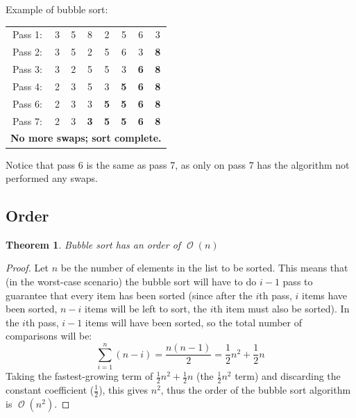 \documentclass{book}
\DeclareMathOperator{\bigO}{\mathcal{O}}
\newtheorem{theorem}{Theorem}[section]
\begin{document}
                Example of bubble sort: \\
                \begin{center}
                \begin{tabular}{c c c c c c c c}
                    Pass 1: &3 &5 &8 &2 &5 &6 &3 \\
                    Pass 2: &3 &5 &2 &5 &6 &3 &\textbf{8} \\
                    Pass 3: &3 &2 &5 &5 &3 &\textbf{6} &\textbf{8} \\
                    Pass 4: &2 &3 &5 &3 &\textbf{5} &\textbf{6} &\textbf{8} \\
                    Pass 6: &2 &3 &3 &\textbf{5} &\textbf{5} &\textbf{6} &\textbf{8} \\
                    Pass 7: &2 &3 &\textbf{3} &\textbf{5} &\textbf{5} &\textbf{6} &\textbf{8} \\
                    \multicolumn{8}{l}{\textbf{No more swaps; sort complete.}}
                \end{tabular}
                \end{center}
                Notice that pass 6 is the same as pass 7, as only on pass 7 has the algorithm not performed any swaps.

            \subsection{Order}
                \begin{theorem}
                    Bubble sort has an order of $\bigO(n)$
                \end{theorem}
                \begin{proof}
                    Let $n$ be the number of elements in the list to be sorted.
                    This means that (in the worst-case scenario) the bubble sort will have to do $i-1$ pass to guarantee that every item has been sorted (since after the $i$th pass, $i$ items have been sorted, $n-i$ items will be left to sort, the $i$th item must also be sorted).
                    In the $i$th pass, $i-1$ items will have been sorted, so the total number of comparisons will be:
                    $$\sum_{i=1}^n(n-i)=\frac{n(n-1)}{2}=\frac{1}{2}n^2+\frac{1}{2}n$$
                    Taking the fastest-growing term of $\frac{1}{2}n^2+\frac{1}{2}n$ (the $\frac{1}{2}n^2$ term) and discarding the constant coefficient ($\frac{1}{2}$), this gives $n^2$, thus the order of the bubble sort algorithm is $\bigO(n^2)$.
                \end{proof}
            
\end{document}
